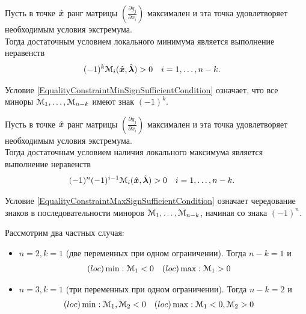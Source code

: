 \begin{teorema}\label{EqualityConstraintMinSufficientCondition}
Пусть в точке $\hat{{\bm x}}$  ранг матрицы $(\frac{\partial g_j}{\partial x_i})$ максимален и 
эта точка удовлетворяет необходимым условия экстремума.\\
Тогда достаточным условием локального минимума является выполнение неравенств
\begin{align}\label{EqualityConstraintMinSignSufficientCondition}
	(-1)^k{\mathcal M}_i(\hat{{\bm x}},\hat{{\bm{ \lambda}}})&>0 & 
	i&=1,\ldots,n-k.
\end{align}
\end{teorema}
\begin{remark}
Условие \eqref{EqualityConstraintMinSignSufficientCondition} означает, что
все миноры ${\mathcal M}_1,\ldots,{\mathcal M}_{n-k}$ имеют знак $(-1)^k$.
\end{remark}

\begin{teorema}\label{EqualityConstraintMaxSufficientCondition}
Пусть в точке $\hat{{\bm x}}$  ранг матрицы $(\frac{\partial g_j}{\partial x_i})$ максимален и 
эта точка удовлетворяет необходимым условия экстремума.\\
Тогда достаточным условием наличия локального максимума является выполнение неравенств
\begin{align}\label{EqualityConstraintMaxSignSufficientCondition}
	(-1)^n(-1)^{i-1}{\mathcal M}_i(\hat{{\bm x}},\hat{{\bm{ \lambda}}})&>0 & 
	i&=1,\ldots,n-k.
\end{align}
\end{teorema}
\begin{remark}
Условие \eqref{EqualityConstraintMaxSignSufficientCondition} означает чередование знаков
в последовательности миноров ${\mathcal M}_1,\ldots,{\mathcal M}_{n-k}$, начиная со знака $(-1)^n$.
\end{remark}
Рассмотрим два частных случая:
\begin{itemize}
	\item \(n=2,k=1\) (две переменных при одном ограничении). Тогда 
	\(n-k=1\) и 
	\begin{align*}
		(loc)\min:&\; {\mathcal M}_1<0 & (loc)\max:&\; {\mathcal M}_1>0
	\end{align*}
	\item \(n=3,k=1\) (три переменных при одном ограничении). Тогда 
	\(n-k=2\) и 
	\begin{align*}
		(loc)\min:&\; {\mathcal M}_1,{\mathcal M}_2<0 & 
		(loc)\max:&\; {\mathcal M}_1<0,{\mathcal M}_2>0
	\end{align*}
\end{itemize}
	
